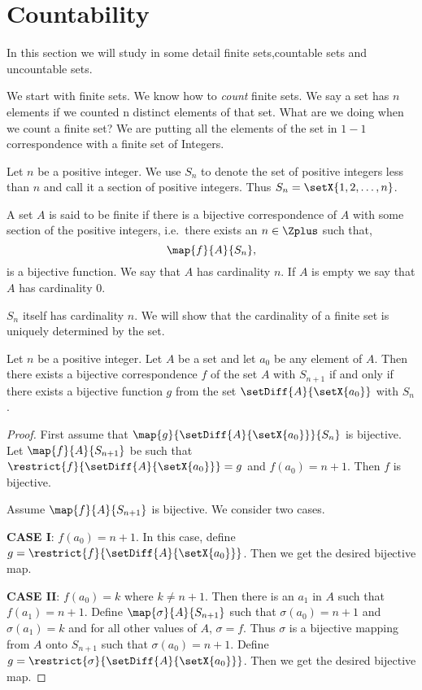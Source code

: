 \chapter{Countability}
In this section we will study in some detail finite sets,countable sets and uncountable sets.

We start with finite sets.
We know how to \emph{count} finite sets. We say a set has $n$ elements if we counted n distinct
elements of that set. What are we doing when we count a finite set? 
We are putting all the elements of the set in $1-1$ correspondence with a finite set of Integers.
 
\begin{Definition}[name=section]
    Let $n$ be a positive integer. We use $S_n$ to denote the set of positive integers less than $n$ and call
    it a section of positive integers. Thus $S_n = \setX{1,2,\ldots,n}$.
\end{Definition}
\begin{Definition}[name=finite sets]
    A set $A$ is said to be finite if there is a bijective correspondence of $A$ with some section of the
    positive integers, i.e.~there exists an $n \in \Zplus$ such that,
    \[\map{f}{A}{S_n},\]
    is a bijective function. We say that $A$ has cardinality $n$. If $A$ is empty we say that $A$ has
    cardinality $0$.
\end{Definition}
\begin{Remark}
    $S_n$ itself has cardinality $n$. We will show that the cardinality of a finite set is uniquely determined
    by the set.
\end{Remark}
\begin{Lemma}
    Let $n$ be a positive integer. Let $A$ be a set and let $a_0$ be any element of $A$. Then there exists a
    bijective correspondence $f$ of the set $A$ with $S_{n+1}$ if and only if there exists a bijective
    function $g$ from the set $\setDiff{A}{\setX{a_0}}$ with $S_{n}$.
\end{Lemma}
\begin{proof}
    First assume that $\map{g}{\setDiff{A}{\setX{a_0}}}{S_n}$ is bijective. Let $\map{f}{A}{S_{n+1}}$ be such
    that $\restrict{f}{\setDiff{A}{\setX{a_0}}} = g $ and $f(a_0) = n+1$. Then $f$ is bijective.

    Assume $\map{f}{A}{S_{n+1}}$ is bijective. We consider two cases.

    \textbf{CASE I}: $f(a_0) = n+1$. In this case, define $g = \restrict{f}{\setDiff{A}{\setX{a_0}}}$. Then we
    get the desired bijective map.

    \textbf{CASE II}: $f(a_0) = k$ where $k \neq n+1$. Then there is an $a_1$ in $A$ such that $f(a_1) = n+1$.
    Define $\map{\sigma}{A}{S_{n+1}}$ such that $\sigma(a_0) = n+1$ and $\sigma(a_1) = k$ and for all other
    values of $A$, $\sigma = f$. Thus $\sigma$ is a bijective mapping from $A$ onto $S_{n+1}$ such that
    $\sigma(a_0) = n+1$. Define $g = \restrict{\sigma}{\setDiff{A}{\setX{a_0}}}$. Then we
    get the desired bijective map.
\end{proof}
